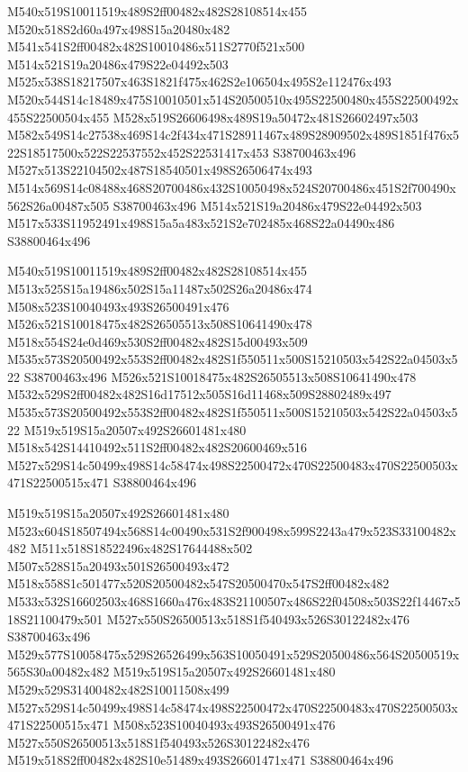 \documentclass{article}
\begin{document}
\begin{multicols}{2}
M540x519S10011519x489S2ff00482x482S28108514x455 M520x518S2d60a497x498S15a20480x482 M541x541S2ff00482x482S10010486x511S2770f521x500 M514x521S19a20486x479S22e04492x503 M525x538S18217507x463S1821f475x462S2e106504x495S2e112476x493 M520x544S14c18489x475S10010501x514S20500510x495S22500480x455S22500492x455S22500504x455 M528x519S26606498x489S19a50472x481S26602497x503 M582x549S14c27538x469S14c2f434x471S28911467x489S28909502x489S1851f476x522S18517500x522S22537552x452S22531417x453 S38700463x496 M527x513S22104502x487S18540501x498S26506474x493 M514x569S14c08488x468S20700486x432S10050498x524S20700486x451S2f700490x562S26a00487x505 S38700463x496 M514x521S19a20486x479S22e04492x503 M517x533S11952491x498S15a5a483x521S2e702485x468S22a04490x486 S38800464x496

M540x519S10011519x489S2ff00482x482S28108514x455 M513x525S15a19486x502S15a11487x502S26a20486x474 M508x523S10040493x493S26500491x476 M526x521S10018475x482S26505513x508S10641490x478 M518x554S24e0d469x530S2ff00482x482S15d00493x509 M535x573S20500492x553S2ff00482x482S1f550511x500S15210503x542S22a04503x522 S38700463x496 M526x521S10018475x482S26505513x508S10641490x478 M532x529S2ff00482x482S16d17512x505S16d11468x509S28802489x497 M535x573S20500492x553S2ff00482x482S1f550511x500S15210503x542S22a04503x522 M519x519S15a20507x492S26601481x480 M518x542S14410492x511S2ff00482x482S20600469x516 M527x529S14c50499x498S14c58474x498S22500472x470S22500483x470S22500503x471S22500515x471 S38800464x496

M519x519S15a20507x492S26601481x480 M523x604S18507494x568S14c00490x531S2f900498x599S2243a479x523S33100482x482 M511x518S18522496x482S17644488x502 M507x528S15a20493x501S26500493x472 M518x558S1c501477x520S20500482x547S20500470x547S2ff00482x482 M533x532S16602503x468S1660a476x483S21100507x486S22f04508x503S22f14467x518S21100479x501 M527x550S26500513x518S1f540493x526S30122482x476 S38700463x496 M529x577S10058475x529S26526499x563S10050491x529S20500486x564S20500519x565S30a00482x482 M519x519S15a20507x492S26601481x480 M529x529S31400482x482S10011508x499 M527x529S14c50499x498S14c58474x498S22500472x470S22500483x470S22500503x471S22500515x471 M508x523S10040493x493S26500491x476 M527x550S26500513x518S1f540493x526S30122482x476 M519x518S2ff00482x482S10e51489x493S26601471x471 S38800464x496


\end{multicols}
\end{document}
